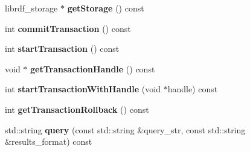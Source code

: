 \begin{DoxyCompactItemize}
librdf\+\_\+storage $\ast$ {\bfseries get\+Storage} () const
\item 
\mbox{\label{classomexmeta_1_1RDF_a711f228bb86c5cbf9740f64b8633d04c}} 
int {\bfseries commit\+Transaction} () const
\item 
\mbox{\label{classomexmeta_1_1RDF_afa2b148ecb235b3ac9497fa3b528d2ed}} 
int {\bfseries start\+Transaction} () const
\item 
\mbox{\label{classomexmeta_1_1RDF_ad30bbe5c9b274713f87d4d4a5f2b28e9}} 
void $\ast$ {\bfseries get\+Transaction\+Handle} () const
\item 
\mbox{\label{classomexmeta_1_1RDF_a278b78d5b1b88397c2eb4143f23dab8b}} 
int {\bfseries start\+Transaction\+With\+Handle} (void $\ast$handle) const
\item 
\mbox{\label{classomexmeta_1_1RDF_af5c7c6104496c09762518d56e94e6048}} 
int {\bfseries get\+Transaction\+Rollback} () const
\item 
\mbox{\label{classomexmeta_1_1RDF_ab168be2c14d53c3fc94024121dc88ba6}} 
std\+::string {\bfseries query} (const std\+::string \&query\+\_\+str, const std\+::string \&results\+\_\+format) const
\end{DoxyCompactItemize}
